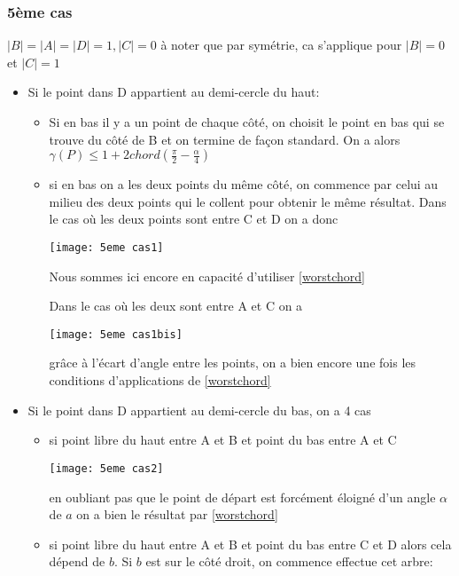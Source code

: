 \subsubsection*{5ème cas} $|B| = |A| = |D| = 1, |C| = 0$
à noter que par symétrie, ca s'applique pour $|B| = 0$ et $|C| = 1$

\begin{itemize}

\item Si le point dans D appartient au demi-cercle du haut:

\begin{itemize}

\item Si en bas il y a un point de chaque côté, on choisit le point en bas qui se trouve du côté de B et on termine de façon standard. On a alors $\gamma(P) \leq 1 + 2chord(\frac{\pi}{2} - \frac{\alpha}{4})$

\item si en bas on a les deux points du même côté, on commence par celui au milieu des deux points qui le collent pour obtenir le même résultat.
Dans le cas où les deux points sont entre C et D on a donc

\texttt{[image: 5eme cas1]}

Nous sommes ici encore en capacité d'utiliser \ref{worstchord}

Dans le cas où les deux sont entre A et C on a

\texttt{[image: 5eme cas1bis]}

grâce à l'écart d'angle entre les points, on a bien encore une fois les conditions d'applications de \ref{worstchord}

\end{itemize}

\item Si le point dans D appartient au demi-cercle du bas, on a 4 cas

\begin{itemize}

\item si point libre du haut entre A et B et point du bas entre A et C

\texttt{[image: 5eme cas2]}

en oubliant pas que le point de départ est forcément éloigné d'un angle $\alpha$ de $a$ on a bien le résultat par \ref{worstchord}

\item si point libre du haut entre A et B et point du bas entre C et D alors cela dépend de $b$. Si $b$ est sur le côté droit, on commence effectue cet arbre:


\end{itemize}
\end{itemize}
